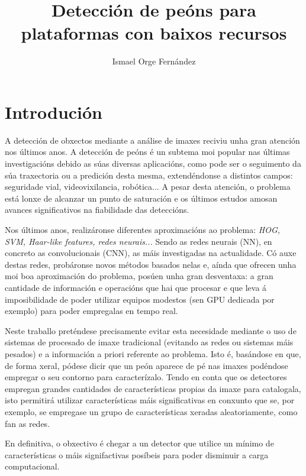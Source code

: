 \documentclass[galician]{./head/uvigo-tfg}
\title{Detección de peóns para plataformas con baixos recursos}
\author{Ismael Orge Fernández}
\begin{document}

\maketitle
\thispagestyle{plain} %

    \section{Introdución}\label{intro}
    A detección de obxectos mediante a análise de imaxes reciviu unha gran atención nos últimos anos. A detección de peóns é un subtema moi popular nas últimas investigacións debido as súas diversas aplicacións, como pode ser o seguimento da súa traxectoria ou a predición desta mesma, extendéndonse a distintos campos: seguridade vial, videovixilancia, robótica... A pesar desta atención, o problema está lonxe de alcanzar un punto de saturación e os últimos estudos amosan avances significativos na fiabilidade das deteccións.
    \par Nos últimos anos, realizáronse diferentes aproximacións ao problema: \textit{HOG, SVM, Haar-like features, redes neurais...} Sendo as redes neurais (NN), en concreto as convolucionais (CNN), as máis investigadas na actualidade.
    Có auxe destas redes, probáronse novos métodos basados nelas e, aínda que ofrecen unha moi boa aproximación do problema, posúen unha gran desventaxa: a gran cantidade de información e operacións que hai que procesar e que leva á imposibilidade de poder utilizar equipos modestos (sen GPU dedicada por exemplo) para poder empregalas en tempo real.
    \par Neste traballo preténdese precisamente evitar esta necesidade mediante o uso de sistemas de procesado de imaxe tradicional (evitando as redes ou sistemas máis pesados) e a información a priori referente ao problema. Isto é, basándose en que, de forma xeral, pódese dicir que un peón aparece de pé nas imaxes podéndose empregar o seu contorno para caracterízalo\cite{zhang}. Tendo en conta que os detectores empregan grandes cantidades de características propias da imaxe para catalogala, isto permitirá utilizar características máis significativas en conxunto que se, por exemplo, se empregase un grupo de características xeradas aleatoriamente, como fan as redes.
    \par En definitiva, o obxectivo é chegar a un detector que utilice un mínimo de características o máis signifactivas posíbeis para poder disminuir a carga computacional.
    
\end{document}
